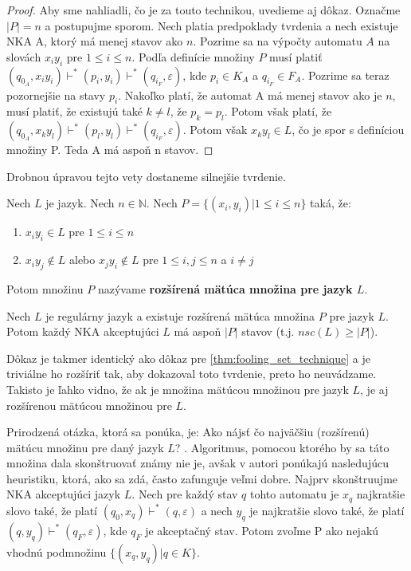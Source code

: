 \begin{proof}
Aby sme nahliadli, čo je za touto technikou, uvedieme aj dôkaz. Označme $ |P|=n $ a postupujme sporom. Nech platia predpoklady tvrdenia a nech existuje NKA A, ktorý má menej stavov ako $ n $. Pozrime sa na výpočty automatu $ A $ na slovách $x_{i}y_{i}$ pre $1 \leq i \leq n$. Podľa definície množiny $ P $ musí platiť $ (q_{0_{A}},x_{i}y_{i}) \vdash^{*} (p_{i}, y_{i}) \vdash^{*} (q_{i_{F}}, \varepsilon) $, kde $p_{i} \in K_{A}$ a $q_{i_{F}} \in F_{A}$. Pozrime sa teraz pozornejšie na stavy $ p_{i} $. Nakoľko platí, že automat A má menej stavov ako je $ n $, musí platiť, že existujú také $k \neq l $, že $ p_{k}=p_{l}  $. Potom však platí, že $ (q_{0_{A}},x_{k}y_{l}) \vdash^{*} (p_{l}, y_{l}) \vdash^{*} (q_{i_{F}}, \varepsilon)$. Potom však $x_{k}y_{l} \in L$, čo je spor s definíciou množiny P. Teda A má aspoň n stavov.
\end{proof}

Drobnou úpravou tejto vety dostaneme silnejšie tvrdenie.

\begin{definition}
\label{def:extended_fooling_set}
Nech $ L $ je jazyk. Nech $ n \in \mathbb{N} $. Nech $ P = \lbrace (x_{i},y_{i}) | 1 \leq i \leq n \rbrace $ taká, že: 

\begin{enumerate}[label=(\alph*)]
\item $x_{i}y_{i} \in L$ pre $1 \leq i \leq n$
\item $x_{i}y_{j} \notin L$ alebo $x_{j}y_{i} \notin L$ pre $1 \leq i,j \leq n$ a $i \neq j$
\end{enumerate}

Potom množinu $ P $ nazývame \textbf{rozšírená mätúca množina pre jazyk $ L $}.
\end{definition}

\begin{theorem}
\label{thm:extended_fooling_set_technique}
Nech $ L $ je regulárny jazyk a existuje rozšírená mätúca množina $ P $ pre jazyk $ L $. Potom každý NKA akceptujúci $ L $ má aspoň $ |P| $ stavov (t.j. $ nsc(L) \geq |P| $).
\end{theorem}

Dôkaz je takmer identický ako dôkaz pre \ref{thm:fooling_set_technique} a je triviálne ho rozšíriť tak, aby dokazoval toto tvrdenie, preto ho neuvádzame. Takisto je ľahko vidno, že ak je množina mätúcou množinou pre jazyk $ L $, je aj rozšírenou mätúcou množinou pre $ L $.
\par
Prirodzená otázka, ktorá sa ponúka, je: \glqq Ako nájsť čo najväčšiu (rozšírenú) mätúcu množinu pre daný jazyk $ L $? \grqq. Algoritmus, pomocou ktorého by sa táto množina dala skonštruovať známy nie je, avšak v 
\cite{GlaisterShalit1996} autori ponúkajú nasledujúcu heuristiku, ktorá, ako sa zdá, často zafunguje veľmi dobre. Najprv skonštruujme NKA akceptujúci jazyk $ L $. Nech pre každý stav $ q $ tohto automatu je $ x_q $ najkratšie slovo také, že platí $ (q_0,x_q) \vdash^{*} (q,\varepsilon) $ a nech $ y_q $ je najkratšie slovo také, že platí $ (q, y_q) \vdash^{*} (q_F,\varepsilon) $, kde $ q_F $ je akceptačný stav. Potom zvoľme P ako nejakú vhodnú podmnožinu $ \lbrace (x_q,y_q) | q \in K \rbrace $.

